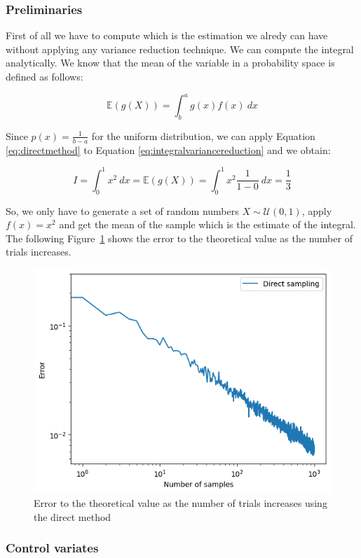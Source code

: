 \documentclass{article}
\begin{document}
\subsubsection{Preliminaries}

First of all we have to compute which is the estimation we alredy can have without applying any variance reduction technique. We can compute the integral analytically. We know that the mean of the variable in a probability space is defined as follows:

\begin{equation} 
	\label{eq:directmethod} 
	\mathbb{E}(g(X)) = \int_b^a g(x)f(x) \ dx
\end{equation}

Since \(p(x) = \frac{1}{b-a}\) for the uniform distribution, we can apply Equation \eqref{eq:directmethod} to Equation \eqref{eq:integralvariancereduction} and we obtain:

\begin{equation} \label{eq:directmethodintegral} I = \int_{0}^{1} x^2 \ dx = \mathbb{E}(g(X)) = \int_0^1 x^2 \frac{1}{1-0} \ dx = \frac{1}{3} \end{equation}

So, we only have to generate a set of random numbers \(X \sim \mathcal{U}(0,1)\), apply \(f(x) = x^2\) and get the mean of the sample which is the estimate of the integral. The following Figure~\ref{fig:directmethod} shows the error to the theoretical value as the number of trials increases.

\begin{figure}[H]
	\centering
	\includegraphics[width=0.5\linewidth]{./Figures/VarianceReduction/direct.png}
	\caption{Error to the theoretical value as the number of trials increases using the direct method}
	\label{fig:directmethod}
\end{figure}

\subsubsection{Control variates}
\end{document}
